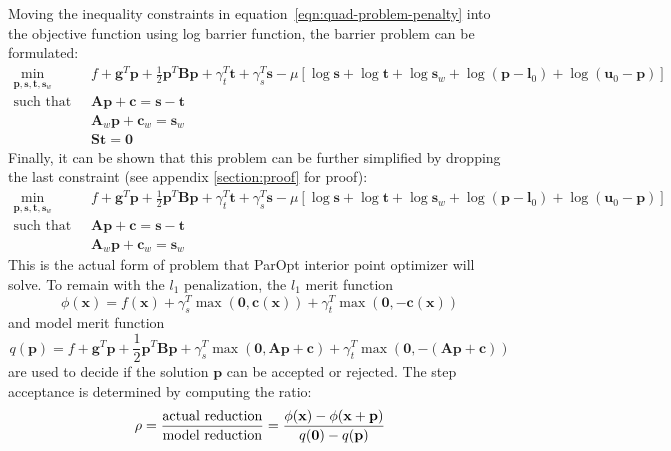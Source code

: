 \documentclass[12pt]{article}
\newcommand{\mb}{\mathbf}
\begin{document}
Moving the inequality constraints in equation~\eqref{eqn:quad-problem-penalty} into the objective function using log barrier function, the barrier problem can be formulated:
%
\begin{equation}
  \label{eqn:quad-problem-barrier}
  \begin{aligned}
    \min_{\mb{p}, \mb{s}, \mb{t}, \mb{s}_w} \qquad & f + \mb{g}^T\mb{p} + \frac{1}{2}\mb{p}^T\mb{B}\mb{p} + \gamma_t^T\mb{t} + \gamma_s^T\mb{s} - \mu \left[ \log \mb{s} + \log \mb{t} + \log \mb{s}_{w} + \log (\mb{p} - \mb{l}_0) + \log (\mb{u}_0 - \mb{p})  \right] \\
    \text{such that} \qquad
    & \mb{A}\mb{p} + \mb{c} = \mb{s} - \mb{t} \\
    & \mb{A}_{w}\mb{p} + \mb{c}_{w} = \mb{s}_w \\
    & \mb{S} \mb{t} = \mb{0}
  \end{aligned}
\end{equation}
%
Finally, it can be shown that this problem can be further simplified by dropping the last constraint (see appendix \ref{section:proof} for proof):
%
\begin{equation}
  \label{eqn:quad-problem-barrier-2}
  \begin{aligned}
    \min_{\mb{p}, \mb{s}, \mb{t}, \mb{s}_w} \qquad & f + \mb{g}^T\mb{p} + \frac{1}{2}\mb{p}^T\mb{B}\mb{p} + \gamma_t^T\mb{t} + \gamma_s^T\mb{s} - \mu \left[ \log \mb{s} + \log \mb{t} + \log \mb{s}_{w} + \log (\mb{p} - \mb{l}_0) + \log (\mb{u}_0 - \mb{p})  \right] \\
    \text{such that} \qquad
    & \mb{A}\mb{p} + \mb{c} = \mb{s} - \mb{t} \\
    & \mb{A}_{w}\mb{p} + \mb{c}_{w} = \mb{s}_w
  \end{aligned}
\end{equation}
%
This is the actual form of problem that ParOpt interior point optimizer will solve.
To remain with the $l_1$ penalization, the $l_1$ merit function
%
\begin{equation}
    \label{eqn:l1-merit-function}
    \phi(\mb{x}) = f(\mb{x}) + \gamma_s^T \max(\mb{0}, \mb{c}(\mb{x})) + \gamma_t^T \max(\mb{0}, -\mb{c}(\mb{x}))
\end{equation}
%
and model merit function
%
\begin{equation}
    \label{eqn:model-merit-function}
    q(\mb{p}) = f + \mb{g}^T\mb{p} + \frac{1}{2}\mb{p}^T\mb{B}\mb{p} + \gamma_s^T \max(\mb{0}, \mb{A}\mb{p} + \mb{c}) + \gamma_t^T \max(\mb{0}, -(\mb{A}\mb{p} + \mb{c}))
\end{equation}
%
are used to decide if the solution $\mb{p}$ can be accepted or rejected. The step acceptance is determined by computing the ratio:
\begin{equation}
    \label{eqn:rho_k}
    \rho = \frac{\mbox{actual reduction}}{\mbox{model reduction}} \\
    = \frac{\phi(\mb{x}) - \phi(\mb{x} + \mb{p})}{q(\mb{0}) - q(\mb{p})}
\end{equation}
\end{document}
